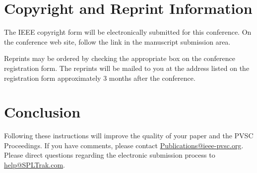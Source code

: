 \documentclass[conference]{IEEEtran}
\begin{document}
\vfil\eject

\section{Copyright and Reprint Information}
The IEEE copyright form will be electronically submitted for this conference.  On the conference web site, follow the link in the manuscript submission area. 

Reprints may be ordered by checking the appropriate box on the conference registration form.  The reprints will be mailed to you at the address listed on the registration form approximately 3 months after the conference.


\section{Conclusion}
Following these instructions will improve the quality of your paper and the PVSC Proceedings. If you have comments, please contact \url{Publications@ieee-pvsc.org}. Please direct questions regarding the electronic submission process to \url{help@SPLTrak.com}. 














%
\end{document}
